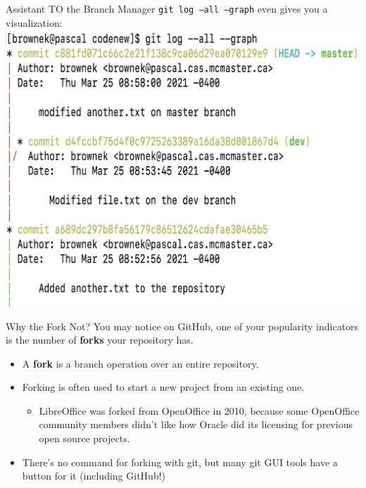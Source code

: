 \documentclass[11pt]{beamer}
\begin{document}
\begin{frame}{Assistant TO the Branch Manager}
\texttt{git log --all --graph} even gives you a visualization: 
\center
\includegraphics[scale=0.12]{gitlogallgraph.png} 
\end{frame}

\begin{frame}{Why the Fork Not?}
You may notice on GitHub, one of your popularity indicators is the number of \textbf{forks} your repository has.  
\begin{itemize}
\item A \textbf{fork} is a branch operation over an entire repository.
\item Forking is often used to start a new project from an existing one.  
\begin{itemize}
\item LibreOffice was forked from OpenOffice in 2010, because some OpenOffice community members didn't like how Oracle did its licensing for previous open source projects.  
\end{itemize}
\item There's no command for forking with git, but many git GUI tools have a button for it (including GitHub!)
\end{itemize}
\end{frame}
\end{document}
